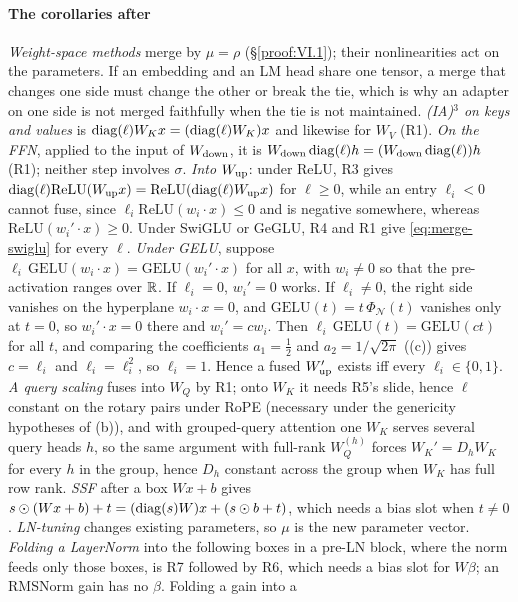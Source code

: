 \paragraph{The corollaries after }
\emph{Weight-space methods} merge by $\mu=\rho$ (\S\ref{proof:VI.1}); their nonlinearities act on the parameters. If an
embedding and an LM head share one tensor, a merge that changes one side must change the other or break the tie, which is why
an adapter on one side is not merged faithfully when the tie is not maintained. \emph{(IA)$^3$ on keys and values} is
$\operatorname{diag}(\ell)W_Kx=(\operatorname{diag}(\ell)W_K)x$ and likewise for $W_V$ (R1). \emph{On the FFN}, applied to the input of $W_{\rm down}$, it is
$W_{\rm down}\operatorname{diag}(\ell)h=(W_{\rm down}\operatorname{diag}(\ell))h$ (R1); neither step involves $\sigma$. \emph{Into $W_{\rm up}$}: under ReLU,
R3 gives $\operatorname{diag}(\ell)\mathrm{ReLU}(W_{\rm up}x)=\mathrm{ReLU}(\operatorname{diag}(\ell)W_{\rm up}x)$ for $\ell\ge0$, while an entry $\ell_i<0$
cannot fuse, since $\ell_i\mathrm{ReLU}(w_i\cdot x)\le0$ and is negative somewhere, whereas $\mathrm{ReLU}(w_i'\cdot x)\ge0$. Under
SwiGLU or GeGLU, R4 and R1 give \eqref{eq:merge-swiglu} for every $\ell$. \emph{Under GELU}, suppose
$\ell_i\,\mathrm{GELU}(w_i\cdot x)=\mathrm{GELU}(w_i'\cdot x)$ for all $x$, with $w_i\ne0$ so that the pre-activation ranges over
$\mathbb{R}$. If $\ell_i=0$, $w_i'=0$ works. If $\ell_i\ne0$, the right side vanishes on the hyperplane $w_i\cdot x=0$, and
$\mathrm{GELU}(t)=t\,\Phi_{\mathcal N}(t)$ vanishes only at $t=0$, so $w_i'\cdot x=0$ there and $w_i'=cw_i$. Then
$\ell_i\,\mathrm{GELU}(t)=\mathrm{GELU}(ct)$ for all $t$, and comparing the coefficients $a_1=\tfrac12$ and $a_2=1/\sqrt{2\pi}$
((c)) gives $c=\ell_i$ and $\ell_i=\ell_i^2$, so $\ell_i=1$. Hence a fused $W_{\rm up}'$ exists iff every
$\ell_i\in\{0,1\}$. \emph{A query scaling} fuses into $W_Q$ by R1; onto $W_K$ it needs R5's slide, hence $\ell$ constant on the
rotary pairs under RoPE (necessary under the genericity hypotheses of (b)), and with grouped-query attention one $W_K$ serves
several query heads $h$, so the same argument with full-rank $W_Q^{(h)}$ forces $W_K'=D_hW_K$ for every $h$ in the group, hence
$D_h$ constant across the group when $W_K$ has full row rank. \emph{SSF} after a box $Wx+b$ gives
$s\odot(Wx+b)+t=(\operatorname{diag}(s)W)x+(s\odot b+t)$, which needs a bias slot when $t\ne0$. \emph{LN-tuning} changes existing parameters, so
$\mu$ is the new parameter vector. \emph{Folding a LayerNorm} into the following boxes in a pre-LN block, where the norm feeds only
those boxes, is R7 followed by R6, which needs a bias slot for $W\beta$; an RMSNorm gain has no $\beta$. Folding a gain into a
